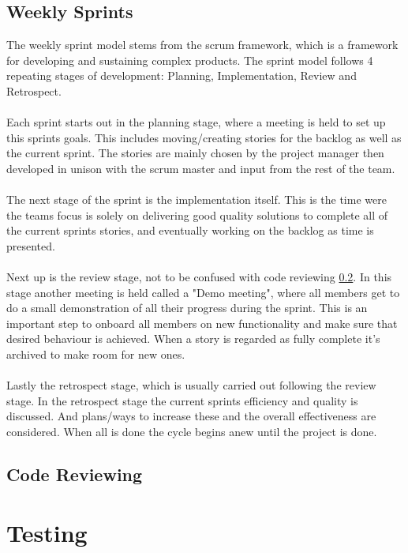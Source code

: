 \subsection{Weekly Sprints} \label{sub:weekly-sprints}
The weekly sprint model stems from the scrum framework, which is a framework for developing and sustaining complex products. The sprint model follows 4 repeating stages of development: Planning, Implementation, Review and Retrospect.
\\\\
Each sprint starts out in the planning stage, where a meeting is held to set up this sprints goals. This includes moving/creating stories for the backlog as well as the current sprint. The stories are mainly chosen by the project manager then developed in unison with the scrum master and input from the rest of the team.
\\\\
The next stage of the sprint is the implementation itself. This is the time were the teams focus is solely on delivering good quality solutions to complete all of the current sprints stories, and eventually working on the backlog as time is presented.
\\\\
Next up is the review stage, not to be confused with code reviewing \ref{sub:code-reviewing}. In this stage another meeting is held called a "Demo meeting", where all members get to do a small demonstration of all their progress during the sprint. This is an important step to onboard all members on new functionality and make sure that desired behaviour is achieved. When a story is regarded as fully complete it's archived to make room for new ones.
\\\\
Lastly the retrospect stage, which is usually carried out following the review stage. In the retrospect stage the current sprints efficiency and quality is discussed. And plans/ways to increase these and the overall effectiveness are considered. When all is done the cycle begins anew until the project is done.

\subsection{Code Reviewing} \label{sub:code-reviewing}

\section{Testing}